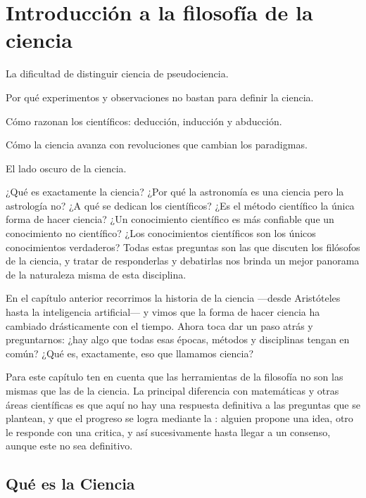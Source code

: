 \chapter{Introducción a la filosofía de la ciencia}
\label{cha:filosofiaciencia}

\begin{enestecapitulo}
	\item[\emoji{thinking-face}] La dificultad de distinguir ciencia de pseudociencia.
	\item[\emoji{magnifying-glass-tilted-left}] Por qué experimentos y observaciones no bastan para definir la ciencia.
	\item[\emoji{brain}] Cómo razonan los científicos: deducción, inducción y abducción.
	\item[\emoji{globe-showing-americas}] Cómo la ciencia avanza con revoluciones que cambian los paradigmas.
	\item[\emoji{warning}] El lado oscuro de la ciencia.
\end{enestecapitulo}

¿Qué es exactamente la ciencia?
¿Por qué la astronomía es una ciencia pero la astrología no?
¿A qué se dedican los científicos?
¿Es el método científico la única forma de hacer ciencia?
¿Un conocimiento científico es más confiable que un conocimiento no científico?
¿Los conocimientos científicos son los únicos conocimientos verdaderos?
Todas estas preguntas son las que discuten los filósofos de la ciencia, y tratar de responderlas y debatirlas nos brinda un mejor panorama de la naturaleza misma de esta disciplina.

En el capítulo anterior recorrimos la historia de la ciencia —desde Aristóteles hasta la inteligencia artificial— y vimos que la forma de hacer ciencia ha cambiado drásticamente con el tiempo.
Ahora toca dar un paso atrás y preguntarnos: ¿hay algo que todas esas épocas, métodos y disciplinas tengan en común?
¿Qué es, exactamente, eso que llamamos ciencia?

Para este capítulo ten en cuenta que las herramientas de la filosofía no son las mismas que las de la ciencia.
La principal diferencia con matemáticas y otras áreas científicas es que aquí no hay una respuesta definitiva a las preguntas que se plantean, y que el progreso se logra mediante la : alguien propone una idea, otro le responde con una critica, y así sucesivamente hasta llegar a un consenso, aunque este no sea definitivo.



\section{Qué es la Ciencia}
\label{sec:queeslaciencia}

